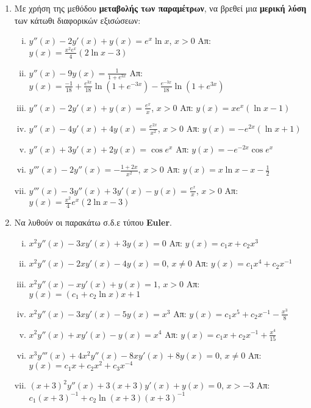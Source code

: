 \begin{enumerate}
  \item Με χρήση της μεθόδου \textbf{μεταβολής των παραμέτρων}, να βρεθεί 
    μια \textbf{μερική λύση} των κάτωθι διαφορικών εξισώσεων:
    \begin{enumerate}[i)]
      \item $y''(x)-2y'(x)+y(x)=e^{x}\ln x$, $x>0$ 
        \hfill Απ: $y(x)=\frac{x^{2}e^{x}}{4}(2\ln x-3)$
      \item $y''(x)-9y(x)=\frac{1}{1+e^{3x}}$ 
        \hfill Απ: $y(x)=\frac{-1}{18}+\frac{e^{3x}}{18}\ln (1+e^{-3x})-
        \frac{e^{-3x}}{18}\ln(1+e^{3x})$
      \item $y''(x)-2y'(x)+y(x)=\frac{e^x}{x}$, $x>0$ \hfill Απ: $y(x)=xe^{x}(\ln x-1)$
      \item $y''(x)-4y'(x)+4y(x)=\frac{e^{2x}}{x^{2}}$, $x>0$ 
        \hfill Απ: $y(x)=-e^{2x}(\ln x +1)$
      \item $y''(x)+3y'(x)+2y(x)=\cos e^{x}$ \hfill Απ: $y(x)=-e^{-2x}\cos e^{x}$
      \item $y'''(x)-2y''(x)=-\frac{1+2x}{x^{2}}$, $x>0$ 
        \hfill Απ: $y(x)=x\ln x-x -\frac{1}{2}$
      \item $y'''(x)-3y''(x)+3y'(x)-y(x)=\frac{e^{x}}{x}$, $x>0$ 
        \hfill Απ: $y(x)=\frac{x^{2}}{4}e^{x}(2\ln x-3)$
    \end{enumerate}

  \item Να λυθούν οι παρακάτω σ.δ.ε τύπου \textbf{Euler}.
    \begin{enumerate}[i)]
      \item $ x^{2}y''(x)-3xy'(x)+3y(x)=0 $ \hfill Απ: $ y(x)=c_{1}x + c_{2}x^{3} $
      \item $ x^{2}y''(x)-2xy'(x)-4y(x)=0 $,\; $ x \neq 0 $ \hfill Απ: $
        y(x)=c_{1}x^{4}+ c_{2} x^{-1} $ 
      \item $ x^{2}y''(x)-xy'(x)+y(x)=1 $,\; $ x>0 $ \hfill Απ: $ y(x)=(c_{1}+c_{2}
        \ln{x})x + 1 $  
      \item $ x^{2}y''(x)-3xy'(x)-5y(x)=x^{3} $ \hfill Απ: $ y(x)=c_{1}x^{5}+ c_{2}
        x^{-1}- \frac{x^{3}}{8} $ 
      \item $ x^{2}y''(x)+xy'(x)-y(x)=x^{4} $ \hfill Απ: $ y(x)=c_{1}x+c_{2}x^{-1}+
        \frac{x^{4}}{15} $ 
      \item $ x^{3}y'''(x)+4x^{2}y''(x)-8xy'(x)+8y(x)=0 $,\; $ x \neq 0 $ \hfill Απ:
        $y(x)=c_{1}x+c_{2}x^{2}+c_{3}x^{-4}$ 
      \item \label{eul} $ (x+3)^{2}y''(x)+3(x+3)y'(x)+y(x)=0 $,\; $ x>-3 $ \hfill Απ:
        $ c_{1}
        (x+3)^{-1} + c_{2}\ln(x+3)(x+3)^{-1} $
    \end{enumerate}


\end{enumerate}
